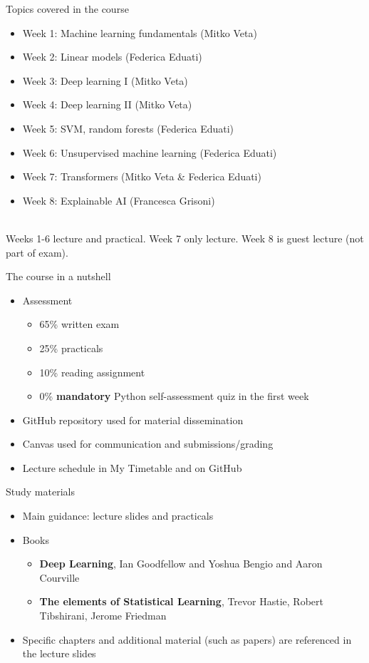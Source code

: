 \documentclass[notes]{beamer}          %
\begin{document}
\begin{frame}{Topics covered in the course}
\begin{itemize}
    \item Week 1: Machine learning fundamentals (Mitko Veta)
    \item Week 2: Linear models (Federica Eduati)
    \item Week 3: Deep learning I (Mitko Veta)
    \item Week 4: Deep learning II (Mitko Veta)
    \item Week 5: SVM, random forests (Federica Eduati)
    \item Week 6: Unsupervised machine learning (Federica Eduati) 
    \item Week 7: Transformers (Mitko Veta \& Federica Eduati) 
    \item Week 8: Explainable AI (Francesca Grisoni) 
\end{itemize}
$\,$\\
Weeks 1-6 lecture and practical. Week 7 only lecture. Week 8 is guest lecture (not part of exam).
\end{frame}

\begin{frame}{The course in a nutshell}
\begin{itemize}
    \item{Assessment}
        \begin{itemize}
            \item 65\% written exam
            \item 25\% practicals
            \item 10\% reading assignment
            \item 0\% \textbf{mandatory} Python self-assessment quiz in the first week
        \end{itemize}
    \item GitHub repository used for material dissemination
    \item Canvas used for communication and submissions/grading
    \item Lecture schedule in My Timetable and on GitHub
    
\end{itemize}
\end{frame}

\begin{frame}{Study materials}
\begin{itemize}
\item Main guidance: lecture slides and practicals
\item Books
\begin{itemize}
    \item \textbf{Deep Learning}, Ian Goodfellow and Yoshua Bengio and Aaron Courville
    \item \textbf{The elements of Statistical Learning}, Trevor Hastie, Robert Tibshirani, Jerome Friedman
\end{itemize}
\item Specific chapters and additional material (such as papers) are referenced in the lecture slides
\end{itemize}
\end{frame}
\end{document}
